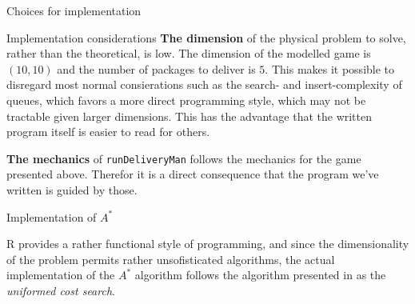 \begin{subsection}{Choices for implementation}
\begin{subsubsection}{Implementation considerations}
      \textbf{The dimension} of the physical problem to solve, rather than the theoretical, is low. The dimension of the modelled game is $(10, 10)$ and the number of packages to deliver is $5$. This makes it possible to disregard most normal consierations such as the search- and insert-complexity of queues, which favors a more direct programming style, which may not be tractable given larger dimensions. This has the advantage that the written program itself is easier to read for others. 
    \end{subsubsection}

    \textbf{The mechanics} of \texttt{runDeliveryMan} follows the mechanics for the game presented above. Therefor it is a direct consequence that the program we've written is guided by those. 

    \begin{subsubsection}{Implementation of $A^*$ }

      R provides a rather functional style of programming, and since the dimensionality of the problem permits rather unsofisticated algorithms, the actual implementation of the $A^*$ algorithm follows the algorithm presented in \cite{rn} as the \textit{uniformed cost search}.

    \end{subsubsection}

  \end{subsection}